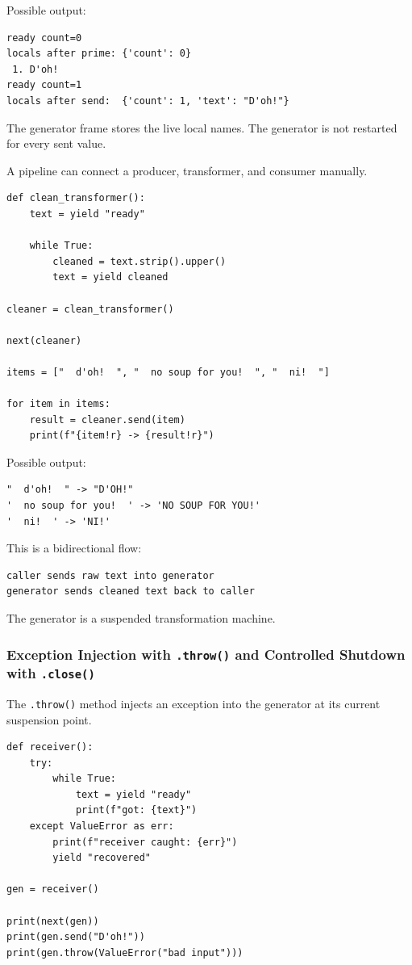 Possible output:

\begin{verbatim}
ready count=0
locals after prime: {'count': 0}
 1. D'oh!
ready count=1
locals after send:  {'count': 1, 'text': "D'oh!"}
\end{verbatim}

The generator frame stores the live local names. The generator is not restarted for every sent value.

A pipeline can connect a producer, transformer, and consumer manually.

\begin{verbatim}
def clean_transformer():
    text = yield "ready"

    while True:
        cleaned = text.strip().upper()
        text = yield cleaned

cleaner = clean_transformer()

next(cleaner)

items = ["  d'oh!  ", "  no soup for you!  ", "  ni!  "]

for item in items:
    result = cleaner.send(item)
    print(f"{item!r} -> {result!r}")
\end{verbatim}

Possible output:

\begin{verbatim}
"  d'oh!  " -> "D'OH!"
'  no soup for you!  ' -> 'NO SOUP FOR YOU!'
'  ni!  ' -> 'NI!'
\end{verbatim}

This is a bidirectional flow:

\begin{verbatim}
caller sends raw text into generator
generator sends cleaned text back to caller
\end{verbatim}

The generator is a suspended transformation machine.

\subsubsection{Exception Injection with \texttt{.throw()} and Controlled Shutdown with \texttt{.close()}}

The \texttt{.throw()} method injects an exception into the generator at its current suspension point.

\begin{verbatim}
def receiver():
    try:
        while True:
            text = yield "ready"
            print(f"got: {text}")
    except ValueError as err:
        print(f"receiver caught: {err}")
        yield "recovered"

gen = receiver()

print(next(gen))
print(gen.send("D'oh!"))
print(gen.throw(ValueError("bad input")))
\end{verbatim}

